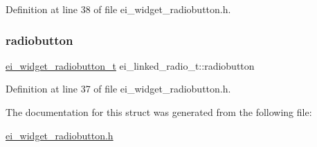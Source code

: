 Definition at line 38 of file ei\+\_\+widget\+\_\+radiobutton.\+h.

\mbox{\label{structei__linked__radio__t_a74ad6c1257741677c69e215d06809b55}} 
\subsubsection{\texorpdfstring{radiobutton}{radiobutton}}
{\footnotesize\ttfamily \hyperlink{structei__widget__radiobutton__t}{ei\+\_\+widget\+\_\+radiobutton\+\_\+t} ei\+\_\+linked\+\_\+radio\+\_\+t\+::radiobutton}



Definition at line 37 of file ei\+\_\+widget\+\_\+radiobutton.\+h.



The documentation for this struct was generated from the following file\+:\begin{DoxyCompactItemize}
\item 
\hyperlink{ei__widget__radiobutton_8h}{ei\+\_\+widget\+\_\+radiobutton.\+h}\end{DoxyCompactItemize}
